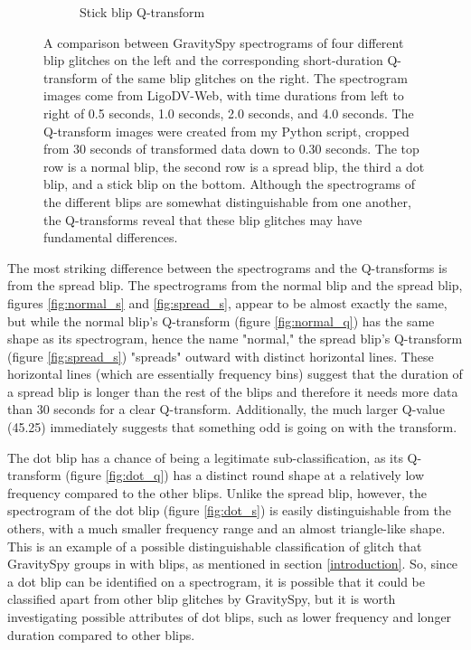 \documentclass[a4paper]{article}
\begin{document}
\begin{figure}[h!]
\begin{subfigure}[t]{.29\textwidth}
		\caption{Stick blip Q-transform}
		\label{fig:stick_q}
	\end{subfigure}
	\caption{A comparison between GravitySpy spectrograms of four different blip glitches on the left and the corresponding short-duration Q-transform of the same blip glitches on the right. The spectrogram images come from LigoDV-Web, with time durations from left to right of 0.5 seconds, 1.0 seconds, 2.0 seconds, and 4.0 seconds. The Q-transform images were created from my Python script, cropped from 30 seconds of transformed data down to 0.30 seconds. The top row is a normal blip, the second row is a spread blip, the third a dot blip, and a stick blip on the bottom. Although the spectrograms of the different blips are somewhat distinguishable from one another, the Q-transforms reveal that these blip glitches may have fundamental differences.}
	\label{fig:comparison}
\end{figure}

The most striking difference between the spectrograms and the Q-transforms is from the spread blip. The spectrograms from the normal blip and the spread blip, figures \ref{fig:normal_s} and \ref{fig:spread_s}, appear to be almost exactly the same, but while the normal blip's Q-transform (figure \ref{fig:normal_q}) has the same shape as its spectrogram, hence the name "normal," the spread blip's Q-transform (figure \ref{fig:spread_s}) "spreads" outward with distinct horizontal lines. These horizontal lines (which are essentially frequency bins) suggest that the duration of a spread blip is longer than the rest of the blips and therefore it needs more data than 30 seconds for a clear Q-transform. Additionally, the much larger Q-value (45.25) immediately suggests that something odd is going on with the transform.

The dot blip has a chance of being a legitimate sub-classification, as its Q-transform (figure \ref{fig:dot_q}) has a distinct round shape at a relatively low frequency compared to the other blips. Unlike the spread blip, however, the spectrogram of the dot blip (figure \ref{fig:dot_s}) is easily distinguishable from the others, with a much smaller frequency range and an almost triangle-like shape. This is an example of a possible distinguishable classification of glitch that GravitySpy groups in with blips, as mentioned in section \ref{introduction}. So, since a dot blip can be identified on a spectrogram, it is possible that it could be classified apart from other blip glitches by GravitySpy, but it is worth investigating possible attributes of dot blips, such as lower frequency and longer duration compared to other blips.
\end{document}
